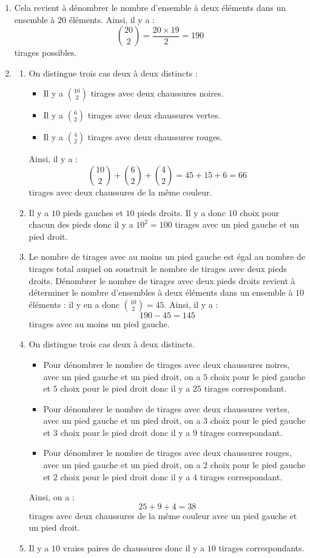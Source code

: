 \documentclass[a4paper,10pt]{report}
\begin{document}
\corr 
\begin{enumerate}
\item Cela revient à dénombrer le nombre d'ensemble à deux éléments dans un ensemble à $20$ éléments. Ainsi, il y a :
$$ \binom{20}{2} = \dfrac{20\times 19}{2} = 190$$
tirages possibles. 
\item \begin{enumerate}
\item On distingue trois cas deux à deux distincts :
\begin{itemize}
\item Il y a $\binom{10}{2}$ tirages avec deux chaussures noires.
\item Il y a $\binom{6}{2}$ tirages avec deux chaussures vertes.
\item Il y a $\binom{4}{2}$ tirages avec deux chaussures rouges.
\end{itemize}
Ainsi, il y a :
$$ \binom{10}{2} + \binom{6}{2} + \binom{4}{2} = 45+ 15+6=66$$
tirages avec deux chaussures de la même couleur.
\item Il y a $10$ pieds gauches et $10$ pieds droits. Il y a donc $10$ choix pour chacun des pieds donc il y a $10^2=100$ tirages avec un pied gauche et un pied droit.
\item Le nombre de tirages avec au moins un pied gauche est égal au nombre de tirages total auquel on soustrait le nombre de tirages avec deux pieds droits. Dénombrer le nombre de tirages avec deux pieds droits revient à déterminer le nombre d'ensembles à deux éléments dans un ensemble à $10$ éléments : il y en a donc $\binom{10}{2}=45$. Ainsi, il y a :
$$ 190 - 45= 145$$
tirages avec au moins un pied gauche. 
\item On distingue trois cas deux à deux distincts.
\begin{itemize}
\item Pour dénombrer le nombre de tirages avec deux chaussures noires, avec un pied gauche et un pied droit, on a $5$ choix pour le pied gauche et $5$ choix pour le pied droit donc il y a $25$ tirages correspondant.
\item Pour dénombrer le nombre de tirages avec deux chaussures vertes, avec un pied gauche et un pied droit, on a $3$ choix pour le pied gauche et $3$ choix pour le pied droit donc il y a $9$ tirages correspondant.
\item Pour dénombrer le nombre de tirages avec deux chaussures rouges, avec un pied gauche et un pied droit, on a $2$ choix pour le pied gauche et $2$ choix pour le pied droit donc il y a $4$ tirages correspondant.
\end{itemize}
Ainsi, on a :
$$ 25+9+4 = 38$$
tirages avec deux chaussures de la même couleur avec un pied gauche et un pied droit.
\item Il y a $10$ vraies paires de chaussures donc il y a $10$ tirages correspondants.
\end{enumerate}
\end{enumerate}
\end{document}
